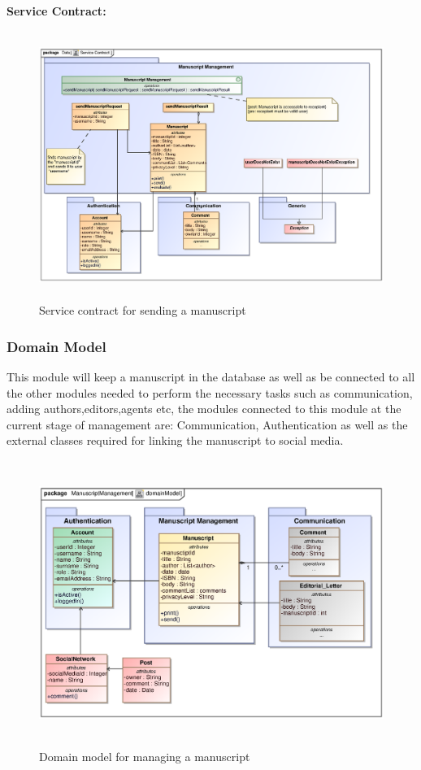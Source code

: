 \begin{enumerate}
\textbf{Service Contract:}

\begin{figure}[h]
\includegraphics[height=330px, width=500px]{epsImages/ManuscriptManagement/sendManuscriptServiceContract.eps}
\caption{Service contract for sending a manuscript}
\end{figure}
 \newpage
\subsubsection{Domain Model} 
\par {This module will keep a manuscript in the database as well as be connected to all the other modules needed to perform the necessary tasks such as communication, adding authors,editors,agents etc, the modules connected to this module at the current stage of management are: Communication, Authentication as well as the external classes required for linking the manuscript to social media.}

 \begin{figure}[h]
\includegraphics[height=350px, width=500px]{epsImages/DomainModels/ManuscriptManagement.eps}
\caption{Domain model for managing a manuscript}
\end{figure}

\end{enumerate}
